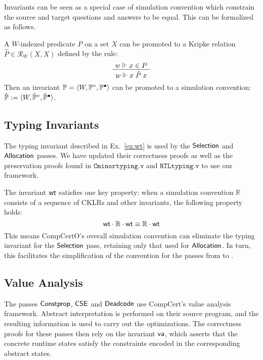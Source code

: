 \documentclass[sigplan,screen]{acmart}
\newenvironment{optional}{}{}
\begin{document}
\begin{optional}
Invariants can be seen as a special case of simulation convention
which constrain the source and target questions and answers
to be equal.
This can be formalized as follows.

\begin{definition}
A $W$-indexed predicate $P$ on a set $X$
can be promoted to a Kripke relation
$\hat{P} \in \mathcal{R}_W(X, X)$
defined by the rule:
\[
  \AxiomC{$w \Vdash x \in P$}
  \UnaryInfC{$w \Vdash x \mathrel{\hat{P}} x$}
  \DisplayProof
\]
Then an invariant
$\mathbb{P} = \langle W, \mathbb{P}^\circ, \mathbb{P}^\bullet \rangle$
can be promoted to a simulation convention:
$\hat{\mathbb{P}} :=
 \langle W, \hat{\mathbb{P}}^\circ, \hat{\mathbb{P}}^\bullet \rangle$.
\end{definition}


\subsection{Typing Invariants} \label{sec:wt} %

The typing invariant described in Ex.~\ref{ex:wt}
is used by the $ \mathsf{Selection} $ and $ \mathsf{Allocation} $ passes.
We have updated their correctness proofs
as well as the preservation proofs found in
$\texttt{Cminortyping.v}$ and $\texttt{RTLtyping.v}$
to use our framework.

The invariant $ \mathsf{wt} $ satisfies one key property:
when a simulation convention $\mathbb{R}$
consists of a sequence of CKLRs and other invariants,
the following property holds:
\[
   \mathsf{wt}  \cdot \mathbb{R} \cdot  \mathsf{wt}  \equiv
  \mathbb{R} \cdot  \mathsf{wt} 
\]
This means CompCertO's overall simulation convention
can eliminate the typing invariant for the $ \mathsf{Selection} $ pass,
retaining only that used for $ \mathsf{Allocation} $.
In turn, this facilitates the simplification of the convention for
the passes from  to .


\subsection{Value Analysis} \label{sec:va} %

The passes
$ \mathsf{Constprop} $, $ \mathsf{CSE} $ and $ \mathsf{Deadcode} $
use CompCert's value analysis framework.
Abstract interpretation is performed %
on their source program,
and the resulting information is used to carry out
the optimizations.
The correctness proofs for these passes then rely
on the invariant $ \mathsf{va} $,
which asserts that the concrete runtime states
satisfy the constraints encoded in the corresponding
abstract states.


\end{optional}
\end{document}
